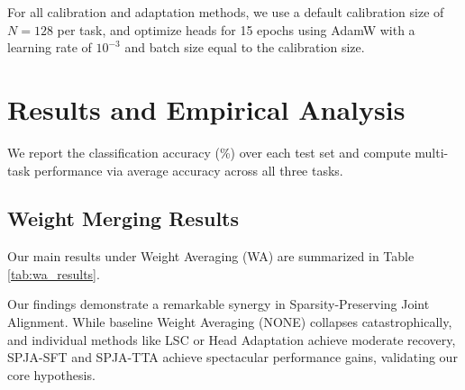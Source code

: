 \documentclass{article}
\theoremstyle{plain}
\theoremstyle{definition}
\theoremstyle{remark}
\begin{document}
For all calibration and adaptation methods, we use a default calibration size of $N=128$ per task, and optimize heads for 15 epochs using AdamW with a learning rate of $10^{-3}$ and batch size equal to the calibration size.

\section{Results and Empirical Analysis}
We report the classification accuracy (\%) over each test set and compute multi-task performance via average accuracy across all three tasks.

\subsection{Weight Merging Results}
Our main results under Weight Averaging (WA) are summarized in Table \ref{tab:wa_results}.
\begin{table}[h]
\caption{Multi-task model merging accuracies (\%) on ResNet-18 vision benchmark under Weight Averaging (WA) with calibration size $N=128$ and random seed $42$. Best merging results are in bold.}
\label{tab:wa_results}
\begin{center}
\begin{small}
\begin{sc}
\end{sc}
\end{small}
\end{center}
\vskip -0.1in
\end{table}
 Our findings demonstrate a remarkable synergy in Sparsity-Preserving Joint Alignment. While baseline Weight Averaging (NONE) collapses catastrophically, and individual methods like LSC or Head Adaptation achieve moderate recovery, SPJA-SFT and SPJA-TTA achieve spectacular performance gains, validating our core hypothesis.
\end{document}
